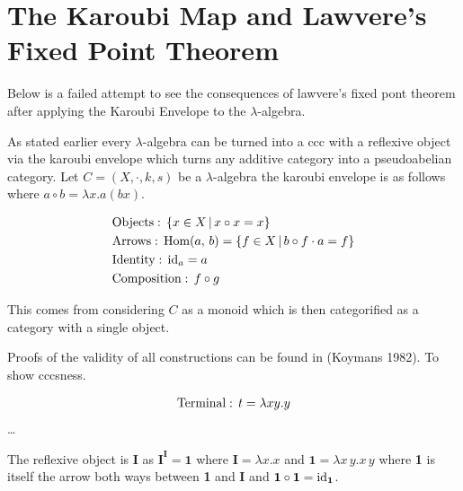 \documentclass[ %
                author={Alessio Zakaria},
                supervisor={Dr. Nicolas Wu},
                degree={MEng},
                title={Automated Theorem Proving in Category Theory and the
                $\lambda$-calculus},
                subtitle={},
                type={Research},
                year={2019} ]{dissertation}
\begin{document}
\backmatter





\appendix

\chapter{The Karoubi Map and Lawvere's Fixed Point Theorem}
\label{appx:karoubi}

Below is a failed attempt to see the consequences of lawvere's fixed pont
theorem after applying the Karoubi Envelope to the $\lambda$-algebra.

As stated earlier every $\lambda$-algebra can be turned into a ccc with a
reflexive object via the karoubi envelope which turns any additive category into
a pseudoabelian category. Let $C = (X, \cdot , k, s)$ be a $\lambda$-algebra the
karoubi envelope is as follows where $a \circ b = \lambda x . a (b x)$.

\begin{align*}
    &\textnormal{Objects}: \, \{ x \in X \, | \, x \circ x = x \} \\
    &\textnormal{Arrows}: \, \textnormal{Hom}(a, \, b) =  \{ f \in X \, | \, b
        \circ f
    \cdot a = f\} \\
    &\textnormal{Identity}: \, \textnormal{id}_{a} = a \\
    &\textnormal{Composition}: \, f \circ g
\end{align*}

This comes from considering $C$ as a monoid which is then categorified as a
category with a single object.

Proofs of the validity of all constructions can be found in (Koymans 1982). To
show cccsness.

\begin{align*}
    &\textnormal{Terminal}: \, t = \lambda x y . y \\
\end{align*}
\ldots

The reflexive object is \textbf{I} as $\textbf{I}^\textbf{I} = \textbf{1}$ where
$\textbf{I} = \lambda x.x$ and $\textbf{1} = \lambda x \, y . x \, y$ where
\textbf{1} is itself the arrow both ways between \textbf{1} and \textbf{I} and
$\textbf{1} \circ \textbf{1} = \textnormal{id}_{\textbf{1}}$.
\end{document}

